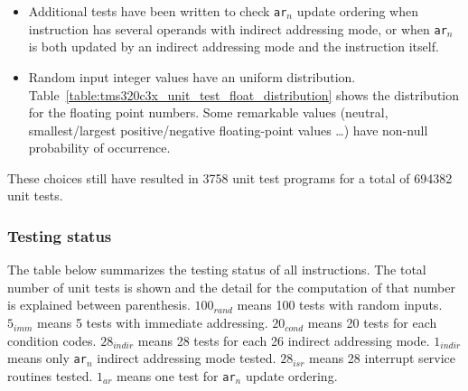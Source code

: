 \begin{itemize}
\item Additional tests have been written to check \texttt{ar$_n$} update ordering when instruction has several operands with indirect addressing mode, or when \texttt{ar$_n$} is both updated by an indirect addressing mode and the instruction itself.
\item Random input integer values have an uniform distribution. Table~\ref{table:tms320c3x_unit_test_float_distribution} shows the distribution for the floating point numbers. Some remarkable values (neutral, smallest/largest positive/negative floating-point values \ldots) have non-null probability of occurrence.
\end{itemize}

These choices still have resulted in 3758 unit test programs for a total of 694382 unit tests.

\subsubsection{Testing status}
\label{tms320c3x_testing_status}

\noindent The table below summarizes the testing status of all instructions. 
The total number of unit tests is shown and the detail for the computation of that number is explained between parenthesis.
$100_{rand}$ means 100 tests with random inputs.
$5_{imm}$ means 5 tests with immediate addressing. 
$20_{cond}$ means 20 tests for each condition codes. 
$28_{indir}$ means 28 tests for each 26 indirect addressing mode. 
$1_{indir}$ means only \texttt{ar$_n$} indirect addressing mode tested. 
$28_{isr}$ means 28 interrupt service routines tested. 
$1_{ar}$ means one test for \texttt{ar$_n$} update ordering.

\newpage

